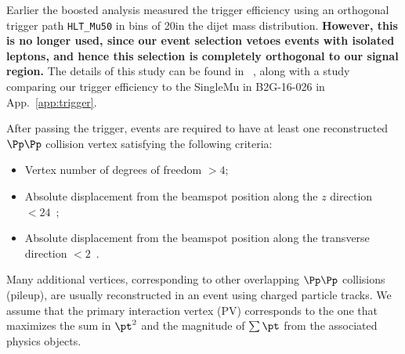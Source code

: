 
Earlier the boosted analysis measured the trigger efficiency using an orthogonal trigger path \texttt{HLT\_Mu50} in bins of 20\GeV in the dijet mass distribution. {\bf However, this is no longer used, since our event selection vetoes events with isolated leptons, and hence this selection is completely orthogonal to our signal region.} The details of this study can be found in ~\cite{CMS-PAS-B2G-16-026}, along with a study comparing our trigger efficiency to the SingleMu in B2G-16-026 in App.~\ref{app:trigger}.

After passing the trigger, events are required to have at least one reconstructed $\Pp\Pp$ collision vertex satisfying the following criteria:
\begin{itemize}
  \item Vertex number of degrees of freedom $> 4$;
  \item Absolute displacement from the beamspot position along the $z$ direction $< 24$~\cm;
  \item Absolute displacement from the beamspot position along the transverse direction $< 2$~\cm.
\end{itemize}
Many additional vertices, corresponding to other overlapping $\Pp\Pp$ collisions (pileup), are usually reconstructed in an event using charged particle tracks. We assume that the primary interaction vertex (PV) corresponds to the one that maximizes the sum in $\pt^2$ and the magnitude of $\sum{\pt}$ from the associated physics objects. 

